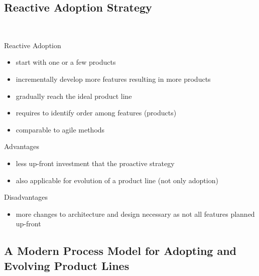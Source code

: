 \subsection{Reactive Adoption Strategy}
\begin{frame}{\myframetitle\ }
	\begin{mycolumns}[animation=none]
		\begin{definition}{Reactive Adoption}
			\begin{itemize}
				\item start with one or a few products
				\item incrementally develop more features resulting in more products
				\item gradually reach the ideal product line
				\item requires to identify order among features (products)
				\item comparable to agile methods
			\end{itemize}
		\end{definition}
	\mynextcolumn
		\begin{note}{Advantages}
			\begin{itemize}
				\item less up-front investment that the proactive strategy
				\item also applicable for evolution of a product line (not only adoption)
			\end{itemize}
		\end{note}
		\begin{note}{Disadvantages}
			\begin{itemize}
				\item more changes to architecture and design necessary as not all features planned up-front
			\end{itemize}
		\end{note}
	\end{mycolumns}
\end{frame}

\subsection{A Modern Process Model for Adopting and Evolving Product Lines}
\begin{frame}{\myframetitle}
	\begin{mycolumns}[animation=none,widths={57,43}]
	\mynextcolumn
	\end{mycolumns}
\end{frame}


